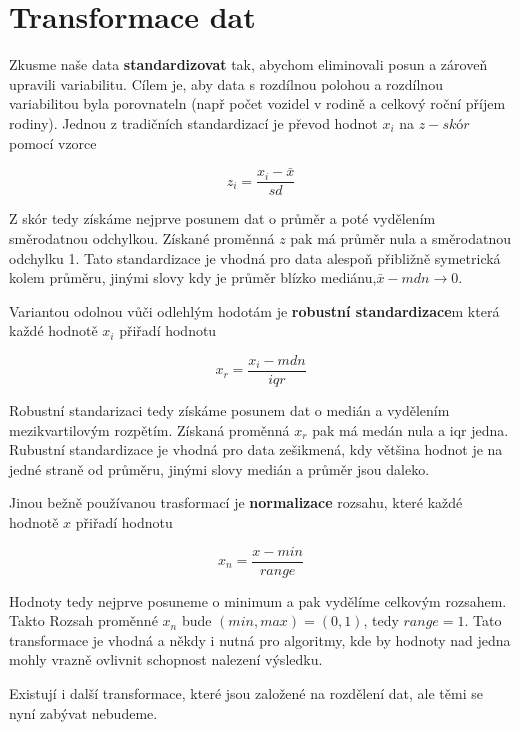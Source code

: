 \documentclass[
  czech,
  11pt,
  letterpaper,
  DIV=11,
  numbers=noendperiod]{scrreprt}
\begin{document}
\section{Transformace dat}\label{transformace-dat}

Zkusme naše data \textbf{standardizovat} tak, abychom eliminovali posun
a zároveň upravili variabilitu. Cílem je, aby data s rozdílnou polohou a
rozdílnou variabilitou byla porovnateln (např počet vozidel v rodině a
celkový roční příjem rodiny). Jednou z tradičních standardizací je
převod hodnot \(x_i\) na \(z-skór\) pomocí vzorce

\[z_i=\frac{x_i-\bar{x}}{sd}\]

Z skór tedy získáme nejprve posunem dat o průměr a poté vydělením
směrodatnou odchylkou. Získané proměnná \(z\) pak má průměr nula a
směrodatnou odchylku 1. Tato standardizace je vhodná pro data alespoň
přibližně symetrická kolem průměru, jinými slovy kdy je průměr blízko
mediánu,\(\bar{x}-mdn\to 0\).

Variantou odolnou vůči odlehlým hodotám je \textbf{robustní
standardizace}m která každé hodnotě \(x_i\) přiřadí hodnotu

\[x_r=\frac{x_i-mdn}{iqr}\]

Robustní standarizaci tedy získáme posunem dat o medián a vydělením
mezikvartilovým rozpětím. Získaná proměnná \(x_r\) pak má medán nula a
iqr jedna. Rubustní standardizace je vhodná pro data zešikmená, kdy
většina hodnot je na jedné straně od průměru, jinými slovy medián a
průměr jsou daleko.

Jinou bežně používanou trasformací je \textbf{normalizace} rozsahu,
které každé hodnotě \(x\) přiřadí hodnotu

\[x_{n}=\frac{x-min}{range}\]

Hodnoty tedy nejprve posuneme o minimum a pak vydělíme celkovým
rozsahem. Takto Rozsah proměnné \(x_n\) bude \((min,max)=(0,1)\), tedy
\(range=1\). Tato transformace je vhodná a někdy i nutná pro algoritmy,
kde by hodnoty nad jedna mohly vrazně ovlivnit schopnost nalezení
výsledku.

Existují i další transformace, které jsou založené na rozdělení dat, ale
těmi se nyní zabývat nebudeme.
\end{document}
